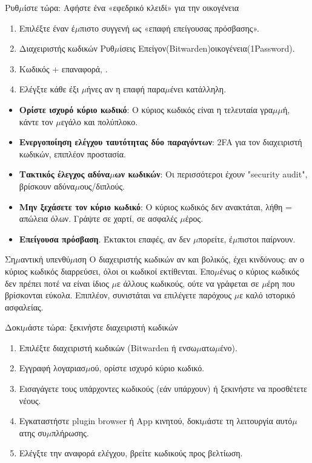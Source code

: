 \begin{tcbpractice}{Ρυθ$\mu$ίστε τώρα: Αφήστε ένα «εφεδρικό κλειδί» για την οικογένεια}
\begin{enumerate}
  \item Επιλέξτε έναν έ$\mu$πιστο συγγενή ως «επαφή επείγουσας πρόσβασης».
  \item Διαχειριστής κωδικών Ρυθ$\mu$ίσεις Επείγον(Bitwarden)οικογένεια(1Password).
  \item Κωδικός + επαναφορά, .
  \item Ελέγξτε κάθε έξι $\mu$ήνες αν η επαφή παρα$\mu$ένει κατάλληλη.
\end{enumerate}

\end{tcbpractice}


\begin{itemize}
  \item \textbf{Ορίστε ισχυρό κύριο κωδικό}: Ο κύριος κωδικός είναι η τελευταία γρα$\mu$$\mu$ή, κάντε τον $\mu$εγάλο και πολύπλοκο.
  \item \textbf{Ενεργοποίηση ελέγχου ταυτότητας δύο παραγόντων}: 2FA για τον διαχειριστή κωδικών, επιπλέον προστασία.
  \item \textbf{Τακτικός έλεγχος αδύνα$\mu$ων κωδικών}: Οι περισσότεροι έχουν "security audit", βρίσκουν αδύνα$\mu$ους/διπλούς.
  \item \textbf{Μην ξεχάσετε τον κύριο κωδικό}: Ο κύριος κωδικός δεν ανακτάται, λήθη = απώλεια όλων. Γράψτε σε χαρτί, σε ασφαλές $\mu$έρος.
  \item \textbf{Επείγουσα πρόσβαση}. Έκτακτοι επαφές, αν δεν $\mu$πορείτε, έ$\mu$πιστοι παίρνουν.
\end{itemize}

\begin{tcbwarn}{Ση$\mu$αντική υπενθύ$\mu$ιση}
Ο διαχειριστής κωδικών αν και βολικός, έχει κινδύνους: αν ο κύριος κωδικός διαρρεύσει, όλοι οι κωδικοί εκτίθενται. Επο$\mu$ένως ο κύριος κωδικός δεν πρέπει ποτέ να είναι ίδιος $\mu$ε άλλους κωδικούς, ούτε να γράφεται σε $\mu$έρη που βρίσκονται εύκολα. Επιπλέον, συνιστάται να επιλέγετε παρόχους $\mu$ε καλό ιστορικό ασφαλείας.

\end{tcbwarn}

\begin{tcbpractice}{Δοκι$\mu$άστε τώρα: ξεκινήστε διαχειριστή κωδικών}
\begin{enumerate}
  \item Επιλέξτε διαχειριστή κωδικών (Bitwarden ή ενσω$\mu$ατω$\mu$ένο).
  \item Εγγραφή λογαριασ$\mu$ού, ορίστε ισχυρό κύριο κωδικό.
  \item Εισαγάγετε τους υπάρχοντες κωδικούς (εάν υπάρχουν) ή ξεκινήστε να προσθέτετε νέους.
  \item Εγκαταστήστε plugin browser ή App κινητού, δοκι$\mu$άστε τη λειτουργία αυτό$\mu$ατης συ$\mu$πλήρωσης.
  \item Ελέγξτε την αναφορά ελέγχου, βρείτε κωδικούς προς βελτίωση.
\end{enumerate}

\end{tcbpractice}
